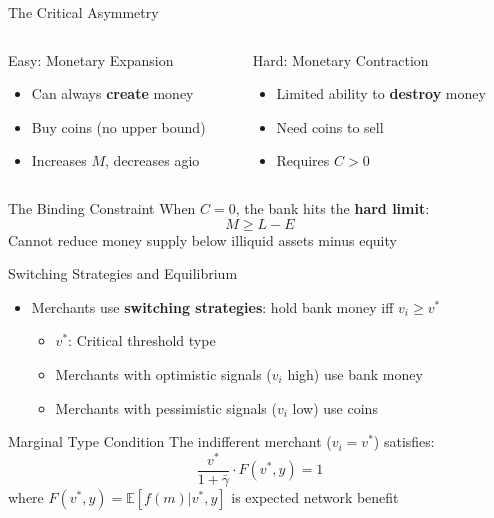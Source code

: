 \documentclass[aspectratio=169, xcolor=table]{beamer}
\begin{document}
\begin{frame}{The Critical Asymmetry}
  \begin{columns}
    \begin{column}{0.5\textwidth}
      \begin{block}{Easy: Monetary Expansion}
        \begin{itemize}
          \item Can always \textbf{create} money
          \item Buy coins (no upper bound)
          \item Increases $M$, decreases agio
        \end{itemize}
      \end{block}
    \end{column}
    \begin{column}{0.5\textwidth}
      \begin{block}{Hard: Monetary Contraction}
        \begin{itemize}
          \item Limited ability to \textbf{destroy} money
          \item Need coins to sell
          \item Requires $C > 0$
        \end{itemize}
      \end{block}
    \end{column}
  \end{columns}

  \begin{alertblock}{The Binding Constraint}
    When $C = 0$, the bank hits the \textbf{hard limit}:
    \[
      M \geq L - E
    \]
    Cannot reduce money supply below illiquid assets minus equity
  \end{alertblock}
\end{frame}

\begin{frame}{Switching Strategies and Equilibrium}
  \begin{itemize}
    \item Merchants use \textbf{switching strategies}: hold bank money iff $v_i \geq v^*$
          \begin{itemize}
            \item $v^*$: Critical threshold type
            \item Merchants with optimistic signals ($v_i$ high) use bank money
            \item Merchants with pessimistic signals ($v_i$ low) use coins
          \end{itemize}
  \end{itemize}
  \begin{block}{Marginal Type Condition}
    The indifferent merchant ($v_i = v^*$) satisfies:
    \[
      \frac{v^*}{1 + \bar{\gamma}} \cdot F(v^*, y) = 1
    \]
    where $F(v^*, y) = \mathbb{E}[f(m)|v^*, y]$ is expected network benefit
  \end{block}
\end{frame}
\end{document}
